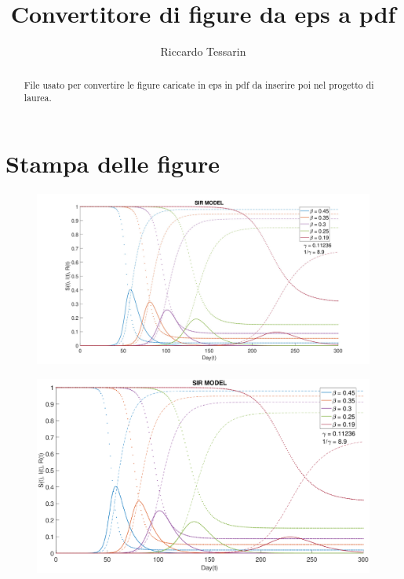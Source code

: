 \documentclass[]{article}
\title{Convertitore di figure da eps a pdf}
\author{Riccardo Tessarin}
\begin{document}
\maketitle

\begin{abstract}
File usato per convertire le figure caricate in eps in pdf da inserire poi nel progetto di laurea. 
\end{abstract}

\section{Stampa delle figure}

\begin{figure}
	\centering
	\includegraphics[width=1\linewidth]{sir_con_rt}
	\caption{}
	\label{fig:sirconrt}
\end{figure}
\begin{figure}
	\centering
	\includegraphics[width=1\linewidth]{sir_multipli_beta}
	\caption{}
	\label{fig:sirmultiplibeta}
\end{figure}
\end{document}
